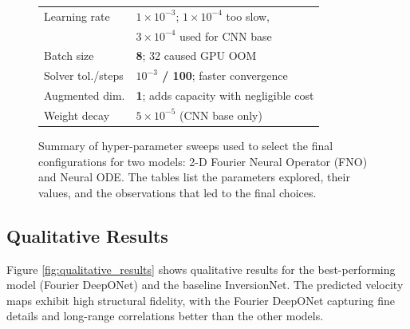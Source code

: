 \documentclass{article}
\begin{document}
\begin{figure}
\begin{minipage}[t]{0.48\linewidth}
\begin{tabularx}{\linewidth}{@{}l X@{}}
Learning rate & \textbf{$1\!\times\!10^{-3}$}; $1\!\times\!10^{-4}$ too slow, \\
              & $3\!\times\!10^{-4}$ used for CNN base \\[2pt]

Batch size & \textbf{8}; 32 caused GPU OOM \\[2pt]

Solver tol./steps & \textbf{$10^{-3}$ / 100}; faster convergence \\[2pt]

Augmented dim. & \textbf{1}; adds capacity with negligible cost \\[2pt]

Weight decay & \textbf{$5\!\times\!10^{-5}$} (CNN base only) \\
\bottomrule
\end{tabularx}
\end{minipage}

\vspace{-6pt}
\caption{Summary of hyper-parameter sweeps used to select the final configurations for two models: 2-D Fourier Neural Operator (FNO) and Neural ODE. The tables list the parameters explored, their values, and the observations that led to the final choices.}
\label{tab:ablation_studies}
\end{figure}

\subsection{Qualitative Results}

Figure \ref{fig:qualitative_results} shows qualitative results for the best-performing model (Fourier DeepONet) and the baseline InversionNet. The predicted velocity maps exhibit high structural fidelity, with the Fourier DeepONet capturing fine details and long-range correlations better than the other models.
\end{document}
